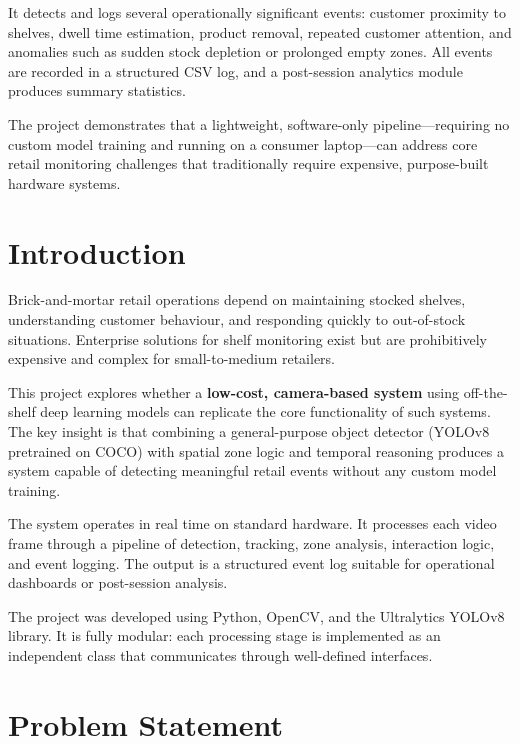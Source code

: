 \documentclass[12pt,a4paper]{article}
\begin{document}
It detects and logs several operationally significant events: customer proximity to shelves, dwell time estimation, product removal, repeated customer attention, and anomalies such as sudden stock depletion or prolonged empty zones.
All events are recorded in a structured CSV log, and a post-session analytics module produces summary statistics.

The project demonstrates that a lightweight, software-only pipeline—requiring no custom model training and running on a consumer laptop—can address core retail monitoring challenges that traditionally require expensive, purpose-built hardware systems.

\section{Introduction}

Brick-and-mortar retail operations depend on maintaining stocked shelves, understanding customer behaviour, and responding quickly to out-of-stock situations.
Enterprise solutions for shelf monitoring exist but are prohibitively expensive and complex for small-to-medium retailers.

This project explores whether a \textbf{low-cost, camera-based system} using off-the-shelf deep learning models can replicate the core functionality of such systems.
The key insight is that combining a general-purpose object detector (YOLOv8 pretrained on COCO) with spatial zone logic and temporal reasoning produces a system capable of detecting meaningful retail events without any custom model training.

The system operates in real time on standard hardware.
It processes each video frame through a pipeline of detection, tracking, zone analysis, interaction logic, and event logging.
The output is a structured event log suitable for operational dashboards or post-session analysis.

The project was developed using Python, OpenCV, and the Ultralytics YOLOv8 library.
It is fully modular: each processing stage is implemented as an independent class that communicates through well-defined interfaces.

\section{Problem Statement}
\end{document}
